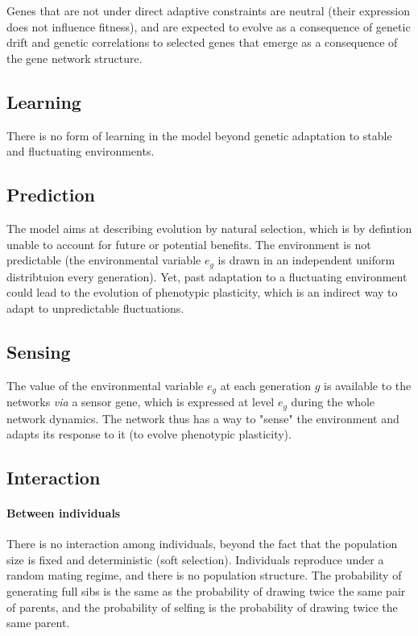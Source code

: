 \documentclass{article}
\begin{document}
Genes that are not under direct adaptive constraints are neutral (their expression does not influence fitness), and are expected to evolve as a consequence of genetic drift and genetic correlations to selected genes that emerge as a consequence of the gene network structure. 

\subsection{Learning}

There is no form of learning in the model beyond genetic adaptation to stable and fluctuating environments. 

\subsection{Prediction}

The model aims at describing evolution by natural selection, which is by defintion unable to account for future or potential benefits. The environment is not predictable (the environmental variable $e_g$ is drawn in an independent uniform distribtuion every generation). Yet, past adaptation to a fluctuating environment could lead to the evolution of phenotypic plasticity, which is an indirect way to adapt to unpredictable fluctuations. 

\subsection{Sensing}

The value of the environmental variable $e_g$ at each generation $g$ is available to the networks \emph{via} a sensor gene, which is expressed at level $e_g$ during the whole network dynamics. The network thus has a way to "sense" the environment and adapts its response to it (to evolve phenotypic plasticity). 

\subsection{Interaction}

\paragraph{Between individuals} There is no interaction among individuals, beyond the fact that the population size is fixed and deterministic (soft selection). Individuals reproduce under a random mating regime, and there is no population structure. The probability of generating full sibs is the same as the probability of drawing twice the same pair of parents, and the probability of selfing is the probability of drawing twice the same parent. 
\end{document}
